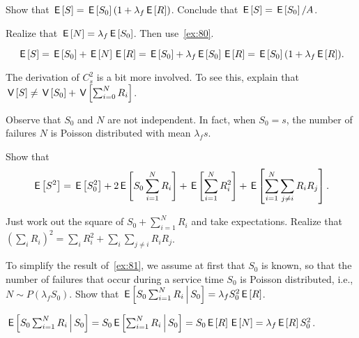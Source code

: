 \begin{extra}
 Show that $\,\mathsf{E}\left[S\right] = \,\mathsf{E}\left[S_0\right] (1+\lambda_f \,\mathsf{E}\left[R\right])$.
 Conclude that $\,\mathsf{E}\left[S\right] = \,\mathsf{E}\left[S_0\right]/A$.
\begin{hint}
 Realize that $\,\mathsf{E}\left[N\right] = \lambda_f \,\mathsf{E}\left[S_0\right]$. Then use~\cref{ex:80}.
\end{hint}
\begin{solution}
 \begin{equation*}
 \,\mathsf{E}\left[S\right] = \,\mathsf{E}\left[S_0\right] + \,\mathsf{E}\left[N\right] \,\mathsf{E}\left[R\right] = \,\mathsf{E}\left[S_0\right] + \lambda_f \,\mathsf{E}\left[S_0\right] \,\mathsf{E}\left[R\right]= \,\mathsf{E}\left[S_0\right](1+\lambda_f \,\mathsf{E}\left[R\right]).
 \end{equation*}
\end{solution}
\end{extra}


\begin{exercise}
 The derivation of $C_s^2$ is a bit more involved.
 To see this, explain that $\,\mathsf{V}\left[S\right] \neq \,\mathsf{V}\left[S_0\right] + \,\mathsf{V}\left[\sum_{i=0}^N R_i\right]$.
\begin{solution}
 Observe that $S_0$ and $N$ are not independent. In fact, when $S_0=s$, the number of failures $N$ is Poisson distributed with mean $\lambda_f s$. 
\end{solution}
\end{exercise}



\begin{extra}
Show that 
\begin{equation*}
 \,\mathsf{E}\left[S^2\right] = \,\mathsf{E}\left[S_0^2\right] + 2\,\mathsf{E}\left[S_0 \sum_{i=1}^N R_i\right] + \,\mathsf{E}\left[\sum_{i=1}^N R_i^2\right] + \,\mathsf{E}\left[\sum_{i=1}^N \sum_{j\neq i} R_i R_j\right].
\end{equation*}
\begin{solution}
 Just work out the square of $S_0+\sum_{i=1}^N R_i$ and take expectations. Realize that $(\sum_i R_i)^2 = \sum_i R_i^2 + \sum_i\sum_{j\neq i} R_i R_j$. 
\end{solution}
\end{extra}


\begin{extra}
 To simplify the result of~\cref{ex:81}, we assume at first that $S_0$ is known, so that the number of failures that occur during a service time $S_0$ is Poisson distributed, i.e., $N\sim P(\lambda_f S_0)$.
 Show that $\,\mathsf{E}\left[S_0 \sum_{i=1}^N R_i\,\middle|\, S_0\right] = \lambda_f S_0^2 \,\mathsf{E}\left[R\right]$.
\begin{solution}
$\,\mathsf{E}\left[S_0 \sum_{i=1}^N R_i\,\middle|\, S_0\right] = 
S_0 \,\mathsf{E}\left[\sum_{i=1}^N R_i\,\middle|\, S_0\right] = S_0 \,\mathsf{E}\left[R\right] \,\mathsf{E}\left[N\right] = \lambda_f \,\mathsf{E}\left[R\right] S_0^2$.
\end{solution}
\end{extra}

